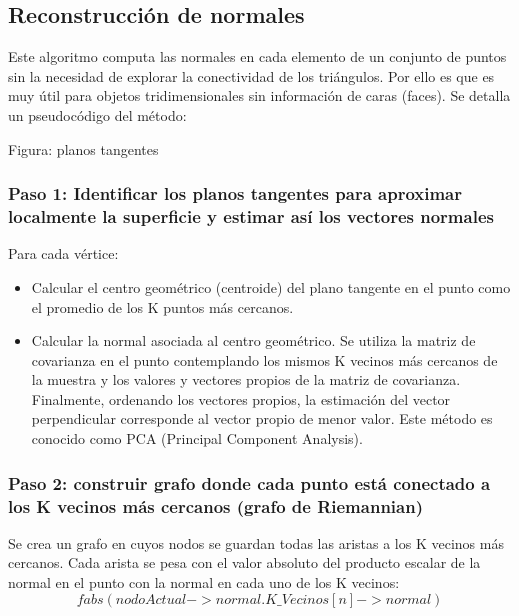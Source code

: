 \subsection{Reconstrucción de normales}

Este algoritmo computa las normales en cada elemento de un conjunto de puntos sin la necesidad de explorar la conectividad de los triángulos. Por ello es que es muy útil para objetos tridimensionales sin información de caras (faces).
Se detalla un pseudocódigo del método:

Figura: planos tangentes

\subsubsection{Paso 1: Identificar los planos tangentes para aproximar localmente la superficie y estimar así los vectores normales}
Para cada vértice:
	\begin{itemize}
		\item Calcular el centro geométrico (centroide) del plano tangente en el punto como el promedio de los K puntos más cercanos.
		\item Calcular la normal asociada al centro geométrico. Se utiliza la matriz de covarianza en el punto contemplando los mismos K vecinos más cercanos de la muestra y los valores y vectores propios de la matriz de covarianza. Finalmente, ordenando los vectores propios, la estimación del vector perpendicular corresponde al vector propio de menor valor. Este método es conocido como PCA (Principal Component Analysis).
	\end{itemize}

\subsubsection{Paso 2: construir grafo donde cada punto está conectado a los K vecinos más cercanos (grafo de Riemannian)}
Se crea un grafo en cuyos nodos se guardan todas las aristas a los K vecinos más cercanos. Cada arista se pesa con el valor absoluto del producto escalar de la normal en el punto con la normal en cada uno de los K vecinos:
   $$fabs(nodoActual->normal . K\_Vecinos[n]->normal)$$
